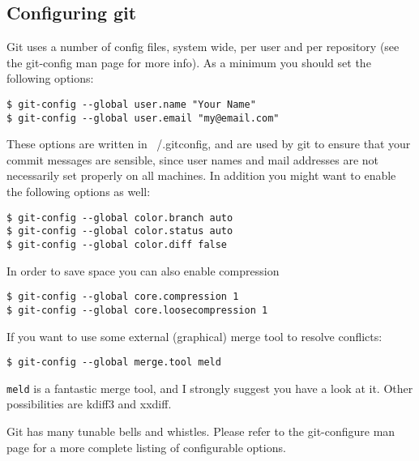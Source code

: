 \documentclass[a4paper,10pt]{article}
\begin{document}
\subsection{Configuring git}
Git uses a number of config files, system
wide, per user and per repository (see the git-config man page for more info).
As a minimum you should set the following options:
\begin{verbatim}
$ git-config --global user.name "Your Name"
$ git-config --global user.email "my@email.com"
\end{verbatim}
These options are written in ~/.gitconfig, and are used by git to ensure that
your commit messages are sensible, since user names and mail addresses are not
necessarily set properly on all machines. In addition you might want to enable
the following options as well:
\begin{verbatim}
$ git-config --global color.branch auto
$ git-config --global color.status auto
$ git-config --global color.diff false
\end{verbatim}
In order to save space you can also enable compression
\begin{verbatim}
$ git-config --global core.compression 1
$ git-config --global core.loosecompression 1
\end{verbatim}
If you want to use some external (graphical) merge tool to resolve conflicts:
\begin{verbatim}
$ git-config --global merge.tool meld
\end{verbatim}
\texttt{meld} is a fantastic merge tool, and I strongly suggest you have a
look at it.  Other possibilities are kdiff3 and xxdiff.

Git has many tunable bells and whistles. Please refer to the git-configure
man page for a more complete listing of configurable options.
\end{document}

